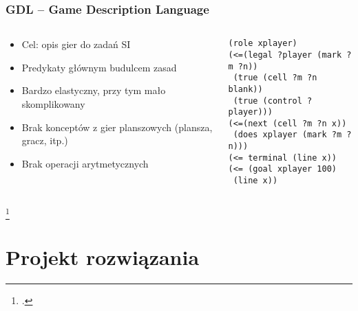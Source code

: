 \documentclass{beamer}
\begin{document}
\begin{frame}[fragile]
	\frametitle{GDL -- Game Description Language\setcounter{footnote}{0}\footnotemark}
	\begin{columns}
		\begin{column}{.50\textwidth}
			\begin{itemize}
				\item Cel: opis gier do zadań SI
				\item Predykaty głównym budulcem zasad %
				\item Bardzo elastyczny, przy tym mało skomplikowany
				\item Brak konceptów z gier planszowych (plansza, gracz, itp.)
				\item Brak operacji arytmetycznych
			\end{itemize}
		\end{column}%
		\hfill
		\begin{column}{.50\textwidth}
			\begin{lstlisting}
(role xplayer)
(<=(legal ?player (mark ?m ?n))
 (true (cell ?m ?n blank))
 (true (control ?player)))
(<=(next (cell ?m ?n x))
 (does xplayer (mark ?m ?n)))
(<= terminal (line x))
(<= (goal xplayer 100)
 (line x))
			\end{lstlisting}
		\end{column}
	\end{columns}
	\footcitetext{GDL}
\end{frame}


\section{Projekt rozwiązania}
\end{document}
